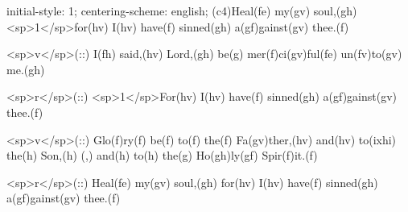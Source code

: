 initial-style: 1;
centering-scheme: english;
(c4)Heal(fe) my(gv) soul,(gh) <sp>1</sp>for(hv) I(hv) have(f) sinned(gh) a(gf)gainst(gv) thee.(f)

<sp>v</sp>(::) I(fh) said,(hv) Lord,(gh) be(g) mer(f)ci(gv)ful(fe) un(fv)to(gv) me.(gh)

<sp>r</sp>(::) <sp>1</sp>For(hv) I(hv) have(f) sinned(gh) a(gf)gainst(gv) thee.(f)

<sp>v</sp>(::) Glo(f)ry(f) be(f) to(f) the(f) Fa(gv)ther,(hv) and(hv) to(ixhi) the(h) Son,(h) (,) and(h) to(h) the(g) Ho(gh)ly(gf) Spir(f)it.(f)

<sp>r</sp>(::) Heal(fe) my(gv) soul,(gh) for(hv) I(hv) have(f) sinned(gh) a(gf)gainst(gv) thee.(f)